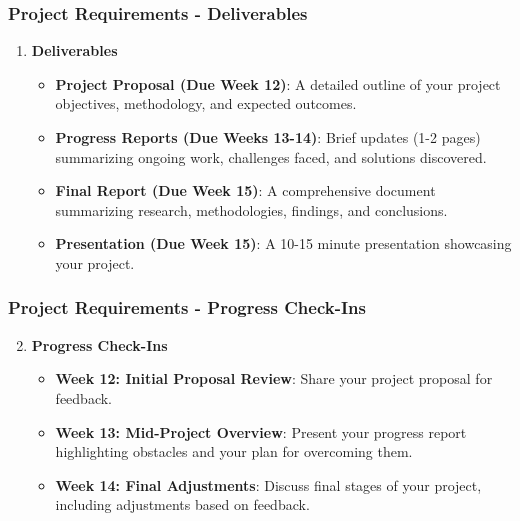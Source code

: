 \documentclass[aspectratio=169]{beamer}
\begin{document}
\begin{frame}[fragile]
    \frametitle{Project Requirements - Deliverables}
    \begin{enumerate}
        \item \textbf{Deliverables}
        \begin{itemize}
            \item \textbf{Project Proposal (Due Week 12)}: A detailed outline of your project objectives, methodology, and expected outcomes.
            \item \textbf{Progress Reports (Due Weeks 13-14)}: Brief updates (1-2 pages) summarizing ongoing work, challenges faced, and solutions discovered.
            \item \textbf{Final Report (Due Week 15)}: A comprehensive document summarizing research, methodologies, findings, and conclusions.
            \item \textbf{Presentation (Due Week 15)}: A 10-15 minute presentation showcasing your project.
        \end{itemize}
    \end{enumerate}
\end{frame}

\begin{frame}[fragile]
    \frametitle{Project Requirements - Progress Check-Ins}
    \begin{enumerate}
        \setcounter{enumi}{1}
        \item \textbf{Progress Check-Ins}
        \begin{itemize}
            \item \textbf{Week 12: Initial Proposal Review}: Share your project proposal for feedback.
            \item \textbf{Week 13: Mid-Project Overview}: Present your progress report highlighting obstacles and your plan for overcoming them.
            \item \textbf{Week 14: Final Adjustments}: Discuss final stages of your project, including adjustments based on feedback.
        \end{itemize}
    \end{enumerate}  
\end{frame}
\end{document}
